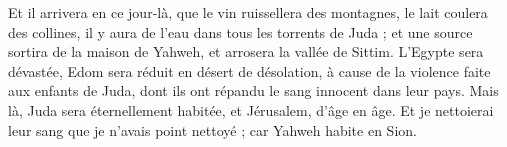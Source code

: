 \begin{multicols}{2}
Et il arrivera en ce jour-là, que le vin ruissellera des montagnes, le lait coulera des collines, il y aura de l'eau dans tous les torrents de Juda ; et une source sortira de la maison de Yahweh, et arrosera la vallée de Sittim.
L'Egypte sera dévastée, Edom sera réduit en désert de désolation, à cause de la violence faite aux enfants de Juda, dont ils ont répandu le sang innocent dans leur pays.
Mais là, Juda sera éternellement habitée, et Jérusalem, d'âge en âge.
Et je nettoierai leur sang que je n'avais point nettoyé ; car Yahweh habite en Sion.
\PPE{}
\end{multicols}
